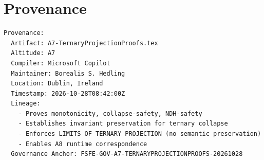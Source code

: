 \documentclass[11pt]{article}
\begin{document}
\newpage


\section*{Provenance}

\begin{verbatim}
Provenance:
  Artifact: A7-TernaryProjectionProofs.tex
  Altitude: A7
  Compiler: Microsoft Copilot
  Maintainer: Borealis S. Hedling
  Location: Dublin, Ireland
  Timestamp: 2026-10-28T08:42:00Z
  Lineage:
    - Proves monotonicity, collapse-safety, NDH-safety
    - Establishes invariant preservation for ternary collapse
    - Enforces LIMITS OF TERNARY PROJECTION (no semantic preservation)
    - Enables A8 runtime correspondence
  Governance Anchor: FSFE-GOV-A7-TERNARYPROJECTIONPROOFS-20261028
\end{verbatim}
\end{document}
